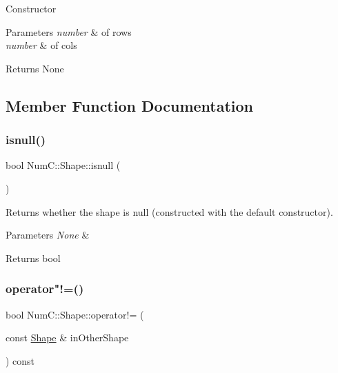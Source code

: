 Constructor


\begin{DoxyParams}{Parameters}
{\em number} & of rows \\
\hline
{\em number} & of cols\\
\hline
\end{DoxyParams}
\begin{DoxyReturn}{Returns}
None 
\end{DoxyReturn}


\subsection{Member Function Documentation}
\mbox{\label{class_num_c_1_1_shape_a180150d51d6ddfbd1db5279489c6866d}} 
\subsubsection{\texorpdfstring{isnull()}{isnull()}}
{\footnotesize\ttfamily bool Num\+C\+::\+Shape\+::isnull (\begin{DoxyParamCaption}{ }\end{DoxyParamCaption})\hspace{0.3cm}{\ttfamily [inline]}}

Returns whether the shape is null (constructed with the default constructor).


\begin{DoxyParams}{Parameters}
{\em None} & \\
\hline
\end{DoxyParams}
\begin{DoxyReturn}{Returns}
bool 
\end{DoxyReturn}
\mbox{\label{class_num_c_1_1_shape_a9067ce9c89bc0859fc17b27ad588bfdf}} 
\subsubsection{\texorpdfstring{operator"!=()}{operator!=()}}
{\footnotesize\ttfamily bool Num\+C\+::\+Shape\+::operator!= (\begin{DoxyParamCaption}\item[{const \mbox{\hyperlink{class_num_c_1_1_shape}{Shape}} \&}]{in\+Other\+Shape }\end{DoxyParamCaption}) const\hspace{0.3cm}{\ttfamily [inline]}}

